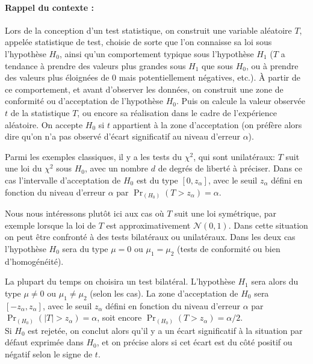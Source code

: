 \documentclass[12pt, a4paper]{book}
\numberwithin{equation}{section}
\begin{document}
\paragraph{Rappel du contexte :} 
Lors de la conception d'un test statistique, on construit une variable aléatoire $T$, appelée statistique de test, choisie de sorte que l'on connaisse sa loi sous l'hypothèse $H_0$, ainsi qu'un comportement typique sous l'hypothèse $H_1$ ($T$ a tendance à prendre des valeurs plus grandes sous $H_1$ que sous $H_0$, ou à prendre des valeurs plus éloignées de $0$ mais potentiellement négatives, etc.). À partir de ce comportement, et avant d'observer les données, on construit une zone de conformité ou d'acceptation de l'hypothèse $H_0$. Puis on calcule la valeur observée $t$ de la statistique $T$, ou encore sa réalisation dans le cadre de l'expérience aléatoire. On accepte $H_0$ si $t$ appartient à la zone d'acceptation (on préfère alors dire qu'on n'a pas observé d'écart significatif au niveau d'erreur $\alpha$).

Parmi les exemples classiques, il y a les tests du $\chi^2$, qui sont unilatéraux: $T$ suit une loi du $\chi^2$ sous $H_0$, avec un nombre $d$ de degrés de liberté à préciser. Dans ce cas l'intervalle d'acceptation de $H_0$ est du type $[0, z_\alpha]$, avec le seuil $z_\alpha$ défini en fonction du niveau d'erreur $\alpha$ par $\Pr_{(H_0)}(T>z_\alpha)=\alpha$.

Nous nous intéressons plutôt ici aux cas où $T$ suit une loi symétrique, par exemple lorsque la loi de $T$ est approximativement $\mathcal{N}(0,1)$. Dans cette situation on peut être confronté à des tests bilatéraux ou unilatéraux. Dans les deux cas l'hypothèse $H_0$ sera du type $\mu=0$ ou $\mu_1=\mu_2$ (tests de conformité ou bien d'homogénéité).

La plupart du temps on choisira un test bilatéral. L'hypothèse $H_1$ sera alors du type $\mu\neq 0$ ou $\mu_1\neq\mu_2$ (selon les cas). La zone d'acceptation de $H_0$ sera $[-z_\alpha, z_\alpha]$, avec le seuil $z_\alpha$ défini en fonction du niveau d'erreur $\alpha$ par $\Pr_{(H_0)}(|T|>z_\alpha)=\alpha$, soit encore $\Pr_{(H_0)}(T>z_\alpha)=\alpha/2$. \\
Si $H_0$ est rejetée, on conclut alors qu'il y a un écart significatif à la situation par défaut exprimée dans $H_0$, et on précise alors si cet écart est du côté positif ou négatif selon le signe de $t$. 
\end{document}
